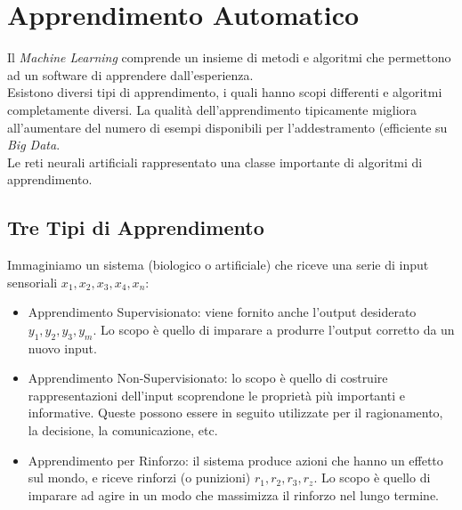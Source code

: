 \documentclass[12pt, a4paper]{article}
\begin{document}
\newpage
\section{Apprendimento Automatico}
Il \textit{Machine Learning} comprende un insieme di metodi e algoritmi che permettono ad un software di apprendere dall'esperienza.\\
Esistono diversi tipi di apprendimento, i quali hanno scopi differenti e algoritmi completamente diversi. La qualità dell'apprendimento tipicamente migliora all'aumentare del numero di esempi disponibili per l'addestramento (efficiente su \textit{Big Data}.\\
Le reti neurali artificiali rappresentato una classe importante di algoritmi di apprendimento.

\subsection{Tre Tipi di Apprendimento}
Immaginiamo un sistema (biologico o artificiale) che riceve una serie di input sensoriali \(x_1,x_2,x_3,x_4,x_n\):
\begin{itemize}
    \item Apprendimento Supervisionato: viene fornito anche l'output desiderato \(y_1,y_2,y_3,y_m\). Lo scopo è quello di imparare a produrre l'output corretto da un nuovo input.
    \item Apprendimento Non-Supervisionato: lo scopo è quello di costruire rappresentazioni dell'input scoprendone le proprietà più importanti e informative. Queste possono essere in seguito utilizzate per il ragionamento, la decisione, la comunicazione, etc.
    \item Apprendimento per Rinforzo: il sistema produce azioni che hanno un effetto sul mondo, e riceve rinforzi (o punizioni) \(r_1,r_2,r_3,r_z\). Lo scopo è quello di imparare ad agire in un modo che massimizza il rinforzo nel lungo termine.
\end{itemize}
\end{document}
